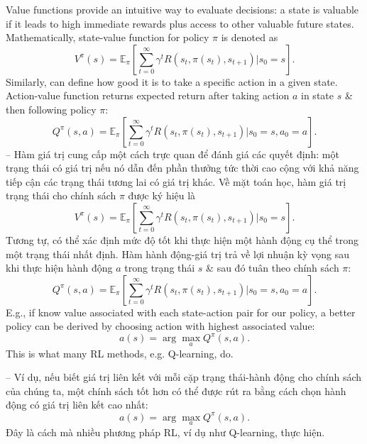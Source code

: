 \documentclass{article}
\begin{document}
\begin{itemize}
\begin{itemize}
\begin{itemize}
            Value functions provide an intuitive way to evaluate decisions: a state is valuable if it leads to high immediate rewards plus access to other valuable future states. Mathematically, state-value function for policy $\pi$ is denoted as
            \begin{equation*}
                V^\pi(s) = \mathbb{E}_\pi\left[\sum_{t=0}^\infty \gamma^tR(s_t,\pi(s_t),s_{t+1})|s_0 = s\right].
            \end{equation*}
            Similarly, can define how good it is to take a specific action in a given state. Action-value function returns expected return after taking action $a$ in state $s$ \& then following policy $\pi$:
            \begin{equation*}
                Q^\pi(s,a) = \mathbb{E}_\pi\left[\sum_{t=0}^\infty \gamma^tR(s_t,\pi(s_t),s_{t+1})|s_0 = s,a_0 = a\right].
            \end{equation*}
            -- Hàm giá trị cung cấp một cách trực quan để đánh giá các quyết định: một trạng thái có giá trị nếu nó dẫn đến phần thưởng tức thời cao cộng với khả năng tiếp cận các trạng thái tương lai có giá trị khác. Về mặt toán học, hàm giá trị trạng thái cho chính sách $\pi$ được ký hiệu là
            \begin{equation*}
                V^\pi(s) = \mathbb{E}_\pi\left[\sum_{t=0}^\infty \gamma^tR(s_t,\pi(s_t),s_{t+1})|s_0 = s\right].
            \end{equation*}
            Tương tự, có thể xác định mức độ tốt khi thực hiện một hành động cụ thể trong một trạng thái nhất định. Hàm hành động-giá trị trả về lợi nhuận kỳ vọng sau khi thực hiện hành động $a$ trong trạng thái $s$ \& sau đó tuân theo chính sách $\pi$:
            \begin{equation*}
                Q^\pi(s,a) = \mathbb{E}_\pi\left[\sum_{t=0}^\infty \gamma^tR(s_t,\pi(s_t),s_{t+1})|s_0 = s,a_0 = a\right].
            \end{equation*}
            E.g., if know value associated with each state-action pair for our policy, a better policy can be derived by choosing action with highest associated value:
            \begin{equation*}
                a(s) = \arg\max_a Q^\pi(s,a).
            \end{equation*}
            This is what many RL methods, e.g. Q-learning, do.

            -- Ví dụ, nếu biết giá trị liên kết với mỗi cặp trạng thái-hành động cho chính sách của chúng ta, một chính sách tốt hơn có thể được rút ra bằng cách chọn hành động có giá trị liên kết cao nhất:
            \begin{equation*}
                a(s) = \arg\max_a Q^\pi(s,a).
            \end{equation*}
            Đây là cách mà nhiều phương pháp RL, ví dụ như Q-learning, thực hiện.


\end{itemize}
\end{itemize}
\end{itemize}
\end{document}
